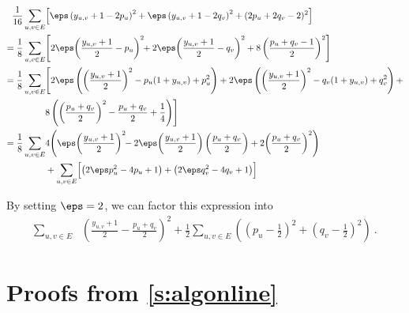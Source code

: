 \begin{align*}
  \frac{1}{16} \sum_{u,v \in E} & \Bigl[ \eps\left(y_{u,v}+1 - 2p_u\right)^2 + \eps\left(y_{u,v}+1 - 2q_v\right)^2
	+ (2p_u +2q_v -2)^2 \Bigr]
\\=
	\frac{1}{8} \sum_{u,v \in E} & \Biggl[ 2\eps\!\left(\frac{y_{u,v}+1}{2} - p_u\right)^2\!\! +  2\eps\!\left(\frac{y_{u,v}+1}{2} - q_v\right)^2
	+ 8\left(\frac{p_u +q_v -1}{2}\right)^2 \Biggr]
\\=
  \frac{1}{8}\sum_{u,v \in E} & \Biggl[ 2\eps\left(\left(\frac{y_{u,v}+1}{2}\right)^2 -
    p_u(1+y_{u,v}) + p_u^2\right) + %
                              2\eps\left(\left(\frac{y_{u,v}+1}{2}\right)^2 - q_v(1+y_{u,v}) + q_v^2\right) +  \\
                              & 8\left(\left(\frac{p_u +q_v}{2}\right)^2 - \frac{p_u+q_v}{2} + \frac{1}{4} \right) \Biggr]
\\=
  \frac{1}{8}\sum_{u,v \in E} & 4\Biggl(\eps\!\left(\frac{y_{u,v}+1}{2}\right)^2\!\! -
  2\eps\!\left(\frac{y_{u,v}+1}{2}\right)\left(\frac{p_u+q_v}{2}\right)
  + 2\!\left(\frac{p_u +q_v}{2}\right)^2\Biggr)
\\&+
  \sum_{u,v \in E} \Bigl[ \left(2\eps p_u^2 - 4p_u + 1\right) + \left(2\eps q_v^2 - 4q_v + 1\right) \Bigr]
\end{align*}

By setting $\eps=2$, we can factor this expression into 
\begin{align*}
  \sum_{u,v \in E} &\left(\frac{y_{u,v}+1}{2} - \frac{p_u+q_v}{2}\right)^2
  + \frac{1}{2}\sum_{u,v \in E} \left(\left(p_u - \frac{1}{2}\right )^2 + \left(q_v -
  \frac{1}{2}\right)^2 \right)~.
\end{align*}

\section{Proofs from \autoref{s:algonline}}

